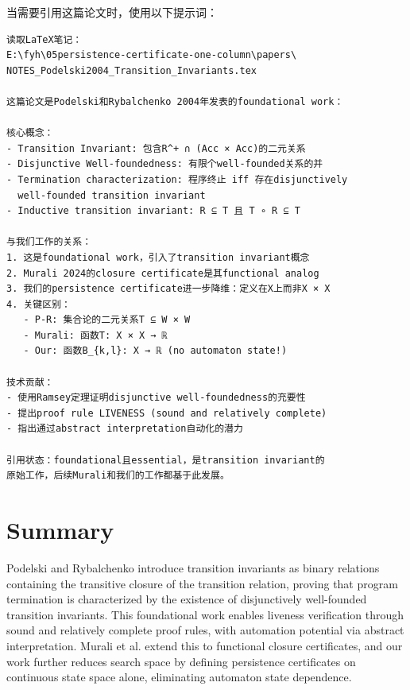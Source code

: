 \documentclass{article}
\begin{document}
当需要引用这篇论文时，使用以下提示词：

\begin{verbatim}
读取LaTeX笔记：
E:\fyh\05persistence-certificate-one-column\papers\
NOTES_Podelski2004_Transition_Invariants.tex

这篇论文是Podelski和Rybalchenko 2004年发表的foundational work：

核心概念：
- Transition Invariant: 包含R^+ ∩ (Acc × Acc)的二元关系
- Disjunctive Well-foundedness: 有限个well-founded关系的并
- Termination characterization: 程序终止 iff 存在disjunctively
  well-founded transition invariant
- Inductive transition invariant: R ⊆ T 且 T ∘ R ⊆ T

与我们工作的关系：
1. 这是foundational work，引入了transition invariant概念
2. Murali 2024的closure certificate是其functional analog
3. 我们的persistence certificate进一步降维：定义在X上而非X × X
4. 关键区别：
   - P-R: 集合论的二元关系T ⊆ W × W
   - Murali: 函数T: X × X → ℝ
   - Our: 函数B_{k,l}: X → ℝ (no automaton state!)

技术贡献：
- 使用Ramsey定理证明disjunctive well-foundedness的充要性
- 提出proof rule LIVENESS (sound and relatively complete)
- 指出通过abstract interpretation自动化的潜力

引用状态：foundational且essential，是transition invariant的
原始工作，后续Murali和我们的工作都基于此发展。
\end{verbatim}

\section{Summary}

Podelski and Rybalchenko introduce transition invariants as binary relations containing the transitive closure of the transition relation, proving that program termination is characterized by the existence of disjunctively well-founded transition invariants. This foundational work enables liveness verification through sound and relatively complete proof rules, with automation potential via abstract interpretation. Murali et al. extend this to functional closure certificates, and our work further reduces search space by defining persistence certificates on continuous state space alone, eliminating automaton state dependence.
\end{document}
